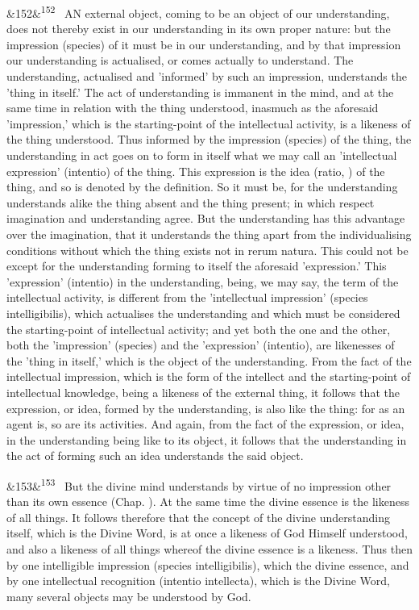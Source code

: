 \documentclass[12pt]{article}
\newcommand{\para}[1][]{\par\noindent\ifx&#1&\else\textsuperscript{\footnotesize #1}~\fi}
\begin{document}
\para[152] AN external object, coming to be an object of our understanding, does not thereby exist in our understanding in its own proper nature: but the impression (species) of it must be in our understanding, and by that impression our understanding is actualised, or comes actually to understand. The understanding, actualised and 'informed' by such an impression, understands the 'thing in itself.' The act of understanding is immanent in the mind, and at the same time in relation with the thing understood, inasmuch as the aforesaid 'impression,' which is the starting-point of the intellectual activity, is a likeness of the thing understood. Thus informed by the impression (species) of the thing, the understanding in act goes on to form in itself what we may call an 'intellectual expression' (intentio) of the thing. This expression is the idea (ratio, ) of the thing, and so is denoted by the definition. So it must be, for the understanding understands alike the thing absent and the thing present; in which respect imagination and understanding agree. But the understanding has this advantage over the imagination, that it understands the thing apart from the individualising conditions without which the thing exists not in rerum natura. This could not be except for the understanding forming to itself the aforesaid 'expression.' This 'expression' (intentio) in the understanding, being, we may say, the term of the intellectual activity, is different from the 'intellectual impression' (species intelligibilis), which actualises the understanding and which must be considered the starting-point of intellectual activity; and yet both the one and the other, both the 'impression' (species) and the 'expression' (intentio), are likenesses of the 'thing in itself,' which is the object of the understanding. From the fact of the intellectual impression, which is the form of the intellect and the starting-point of intellectual knowledge, being a likeness of the external thing, it follows that the expression, or idea, formed by the understanding, is also like the thing: for as an agent is, so are its activities. And again, from the fact of the expression, or idea, in the understanding being like to its object, it follows that the understanding in the act of forming such an idea understands the said object.

\para[153] But the divine mind understands by virtue of no impression other than its own essence (Chap. ). At the same time the divine essence is the likeness of all things. It follows therefore that the concept of the divine understanding itself, which is the Divine Word, is at once a likeness of God Himself understood, and also a likeness of all things whereof the divine essence is a likeness. Thus then by one intelligible impression (species intelligibilis), which the divine essence, and by one intellectual recognition (intentio intellecta), which is the Divine Word, many several objects may be understood by God.
\end{document}
